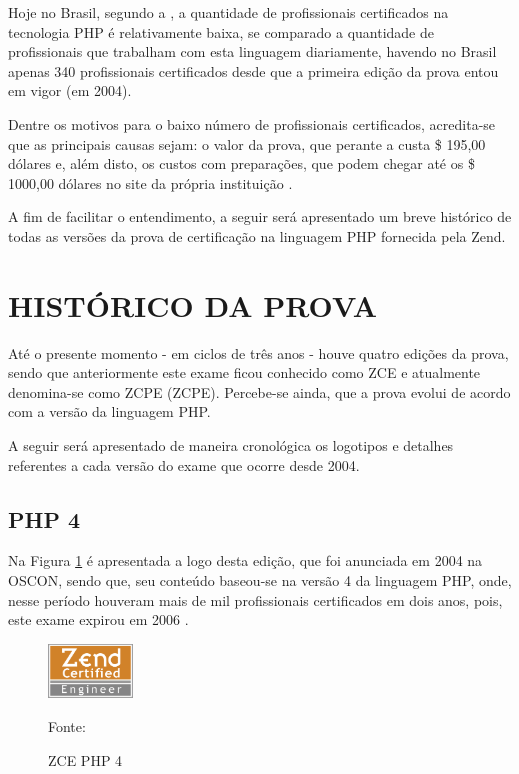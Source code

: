 Hoje no Brasil, segundo a , a 
quantidade de profissionais certificados na tecnologia \acs{PHP} é relativamente 
baixa, se comparado a quantidade de profissionais que trabalham com esta 
linguagem diariamente, havendo no Brasil apenas 340 profissionais certificados
desde que a primeira edição da prova entou em vigor (em 2004).

Dentre os motivos para o baixo número de profissionais certificados, acredita-se
que as principais causas sejam: o valor da prova, que perante a 
 custa \$ 195,00 dólares e, além disto, 
os custos com preparações, que podem chegar até os \$ 1000,00 dólares no site da 
própria instituição \cite{websiteZendOnlineTraining}.

A fim de facilitar o entendimento, a seguir será apresentado um breve histórico
de todas as versões da prova de certificação na linguagem \acs{PHP} fornecida
pela \acs{Zend}.

\section{HISTÓRICO DA PROVA}

Até o presente momento - em ciclos de três anos - houve quatro edições da
prova, sendo que anteriormente este exame ficou conhecido como \ac{ZCE} e
atualmente denomina-se como \acl{ZCPE} (\acs{ZCPE}). Percebe-se ainda, que a
prova evolui de acordo com a versão da linguagem \acs{PHP}.

A seguir será apresentado de maneira cronológica os logotipos e detalhes
referentes a cada versão do exame que ocorre desde 2004.

\subsection{PHP 4}

Na Figura \ref{fig:logoCertificationPHP4} é apresentada a logo desta edição, que
foi anunciada em 2004 na \ac{OSCON}, sendo que, seu conteúdo baseou-se na versão
4 da linguagem \acs{PHP}, onde, nesse período houveram mais de mil profissionais 
certificados em dois anos, pois, este exame expirou em 2006
\cite{entrevistaAriZCEBrasil}.

\begin{figure}[h!tb]
	\caption{ZCE PHP 4}
	\label{fig:logoCertificationPHP4}

	\centering
	\includegraphics[width=0.2\textwidth]{images/logo/php4.png}

	\centering
	\footnotesize Fonte: 
\end{figure}

